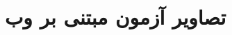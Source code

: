 
\chapter{تصاویر آزمون مبتنی بر وب}
\label{app:latex:more}
\thispagestyle{empty}
\TaskImagesCommand



